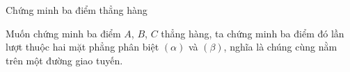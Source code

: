 \begin{dang}{Chứng minh ba điểm thẳng hàng}
\begin{note}
	Muốn chứng minh ba điểm $A$, $B$, $C$ thẳng hàng, ta chứng minh ba điểm đó lần lượt thuộc hai mặt phẳng phân biệt $(\alpha)$ và $(\beta)$, nghĩa là chúng cùng nằm trên một đường giao tuyến.
\end{note}
	
\end{dang}
